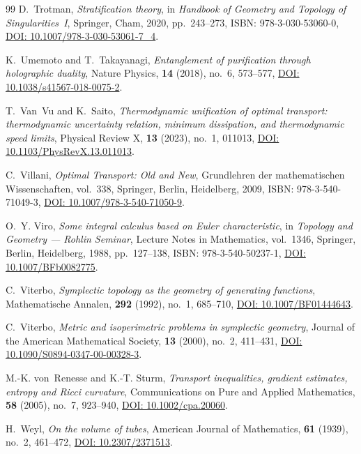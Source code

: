 \documentclass[11pt,a4paper,reqno]{amsart}
\theoremstyle{definition}
\theoremstyle{remark}
\numberwithin{equation}{section}
\begin{document}
\begin{thebibliography}{99}
D.~Trotman,
\emph{Stratification theory},
in \emph{Handbook of Geometry and Topology of Singularities~I}, Springer, Cham, 2020, pp.~243--273,
ISBN: 978-3-030-53060-0,
\href{https://doi.org/10.1007/978-3-030-53061-7_4}{DOI: 10.1007/978-3-030-53061-7\_4}.

K.~Umemoto and T.~Takayanagi,
\emph{Entanglement of purification through holographic duality},
Nature Physics, \textbf{14} (2018), no.~6, 573--577,
\href{https://doi.org/10.1038/s41567-018-0075-2}{DOI: 10.1038/s41567-018-0075-2}.

T.~Van~Vu and K.~Saito,
\emph{Thermodynamic unification of optimal transport: thermodynamic uncertainty relation, minimum dissipation, and thermodynamic speed limits},
Physical Review X, \textbf{13} (2023), no.~1, 011013,
\href{https://doi.org/10.1103/PhysRevX.13.011013}{DOI: 10.1103/PhysRevX.13.011013}.

C.~Villani,
\emph{Optimal Transport: Old and New},
Grundlehren der mathematischen Wissenschaften, vol.~338, Springer, Berlin, Heidelberg, 2009,
ISBN: 978-3-540-71049-3,
\href{https://doi.org/10.1007/978-3-540-71050-9}{DOI: 10.1007/978-3-540-71050-9}.

O.~Y. Viro,
\emph{Some integral calculus based on Euler characteristic},
in \emph{Topology and Geometry --- Rohlin Seminar}, Lecture Notes in Mathematics, vol.~1346, Springer, Berlin, Heidelberg, 1988, pp.~127--138,
ISBN: 978-3-540-50237-1,
\href{https://doi.org/10.1007/BFb0082775}{DOI: 10.1007/BFb0082775}.

C.~Viterbo,
\emph{Symplectic topology as the geometry of generating functions},
Mathematische Annalen, \textbf{292} (1992), no.~1, 685--710,
\href{https://doi.org/10.1007/BF01444643}{DOI: 10.1007/BF01444643}.

C.~Viterbo,
\emph{Metric and isoperimetric problems in symplectic geometry},
Journal of the American Mathematical Society, \textbf{13} (2000), no.~2, 411--431,
\href{https://doi.org/10.1090/S0894-0347-00-00328-3}{DOI: 10.1090/S0894-0347-00-00328-3}.

M.-K. von~Renesse and K.-T. Sturm,
\emph{Transport inequalities, gradient estimates, entropy and Ricci curvature},
Communications on Pure and Applied Mathematics, \textbf{58} (2005), no.~7, 923--940,
\href{https://doi.org/10.1002/cpa.20060}{DOI: 10.1002/cpa.20060}.

H.~Weyl,
\emph{On the volume of tubes},
American Journal of Mathematics, \textbf{61} (1939), no.~2, 461--472,
\href{https://doi.org/10.2307/2371513}{DOI: 10.2307/2371513}.


\end{thebibliography}
\end{document}
